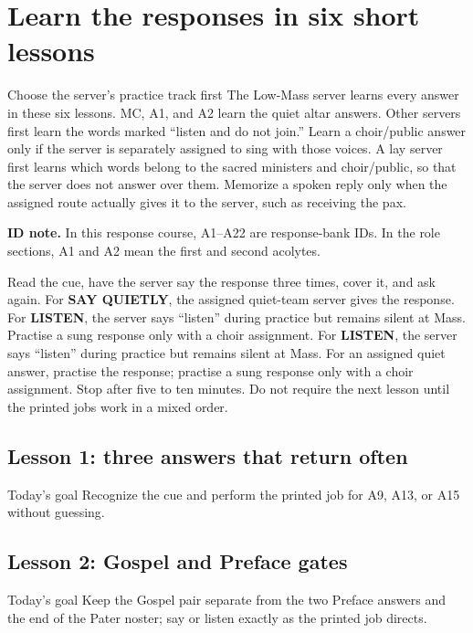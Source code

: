 \ifCardsOnlyGuide\else
\section{Learn the responses in six short lessons}
\label{sec:response-lessons}

\begin{familybox}{Choose the server's practice track first}
\GuideVoiceChoice
{The Low-Mass server learns every answer in these six lessons.}
{MC, A1, and A2 learn the quiet altar answers. Other servers first learn the
words marked ``listen and do not join.'' Learn a choir/public answer only if
the server is separately assigned to sing with those voices.}
{A lay server first learns which words belong to the sacred ministers and
choir/public, so that the server does not answer over them. Memorize a spoken
reply only when the assigned route actually gives it to the server, such as
receiving the pax.}

\ifLowMassGuide\else
\textbf{ID note.} In this response course, A1--A22 are response-bank IDs. In
the role sections, A1 and A2 mean the first and second acolytes.
\fi

\GuideVoiceChoice
{Read the cue, have the server say the response three times, cover it, and ask
again.}
{For \textbf{SAY QUIETLY}, the assigned quiet-team server gives the response.
For \textbf{LISTEN}, the server says ``listen'' during practice but remains
silent at Mass. Practise a sung response only with a choir assignment.}
{For \textbf{LISTEN}, the server says ``listen'' during practice but remains
silent at Mass. For an assigned quiet answer, practise the response; practise
a sung response only with a choir assignment.}
Stop after five to ten minutes. Do not require the next lesson until the
printed jobs work in a mixed order.
\end{familybox}

\subsection{Lesson 1: three answers that return often}
\begin{learnerbox}{Today's goal}
Recognize the cue and perform the printed job for A9, A13, or A15 without
guessing.
\par\smallskip
{}
\end{learnerbox}

\subsection{Lesson 2: Gospel and Preface gates}
\begin{learnerbox}{Today's goal}
Keep the Gospel pair separate from the two Preface answers and the end of the
Pater noster; say or listen exactly as the printed job directs.
\par\smallskip
{}
\end{learnerbox}

